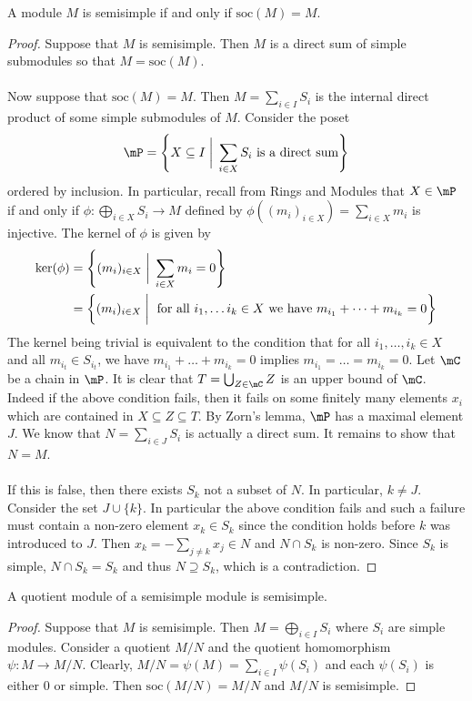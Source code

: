 \documentclass[a4paper]{article}
\begin{document}
\begin{thm}{}{} A module $M$ is semisimple if and only if $\text{soc}(M)=M$. \tcbline
\begin{proof}
Suppose that $M$ is semisimple. Then $M$ is a direct sum of simple submodules so that $M=\text{soc}(M)$. \\~\\

Now suppose that $\text{soc}(M)=M$. Then $M=\sum_{i\in I}S_i$ is the internal direct product of some simple submodules of $M$. Consider the poset $$\mP=\left\{X\subseteq I\;\bigg{|}\;\sum_{i\in X}S_i\text{ is a direct sum}\right\}$$ ordered by inclusion. In particular, recall from Rings and Modules that $X\in\mP$ if and only if $\phi:\bigoplus_{i\in X}S_i\to M$ defined by $\phi\left((m_i)_{i\in X}\right)=\sum_{i\in X}m_i$ is injective. The kernel of $\phi$ is given by 
\begin{align*}
\ker(\phi)&=\left\{(m_i)_{i\in X}\;\bigg{|}\;\sum_{i\in X}m_i=0\right\}\\
&=\left\{(m_i)_{i\in X}\;\bigg{|}\;\text{ for all }i_1,\dots i_k\in X\text{ we have }m_{i_1}+\dots+m_{i_k}=0\right\}
\end{align*}
The kernel being trivial is equivalent to the condition that for all $i_1,\dots,i_k\in X$ and all $m_{i_t}\in S_{i_t}$, we have $m_{i_1}+\dots+m_{i_k}=0$ implies $m_{i_1}=\dots=m_{i_k}=0$. Let $\mC$ be a chain in $\mP$. It is clear that $T=\bigcup_{Z\in\mC}Z$ is an upper bound of $\mC$. Indeed if the above condition fails, then it fails on some finitely many elements $x_i$ which are contained in $X\subseteq Z\subseteq T$. By Zorn's lemma, $\mP$ has a maximal element $J$. We know that $N=\sum_{i\in J}S_i$ is actually a direct sum. It remains to show that $N=M$. \\~\\

If this is false, then there exists $S_k$ not a subset of $N$. In particular, $k\neq J$. Consider the set $J\cup\{k\}$. In particular the above condition fails and such a failure must contain a non-zero element $x_k\in S_k$ since the condition holds before $k$ was introduced to $J$. Then $x_k=-\sum_{j\neq k}x_j\in N$ and $N\cap S_k$ is non-zero. Since $S_k$ is simple, $N\cap S_k=S_k$ and thus $N\supseteq S_k$, which is a contradiction. 
\end{proof}
\end{thm}

\begin{crl}{}{} A quotient module of a semisimple module is semisimple. \tcbline
\begin{proof}
Suppose that $M$ is semisimple. Then $M=\bigoplus_{i\in I}S_i$ where $S_i$ are simple modules. Consider a quotient $M/N$ and the quotient homomorphism $\psi:M\to M/N$. Clearly, $M/N=\psi(M)=\sum_{i\in I}\psi(S_i)$ and each $\psi(S_i)$ is either $0$ or simple. Then $\text{soc}(M/N)=M/N$ and $M/N$ is semisimple. 
\end{proof}
\end{crl}
\end{document}
